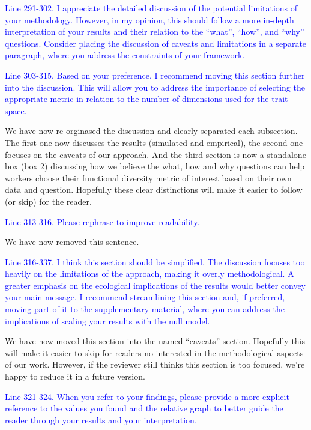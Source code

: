 \documentclass[
]{article}
\begin{document}
\textcolor{blue}{Line 291-302.
I appreciate the detailed discussion of the potential limitations of your methodology.
However, in my opinion, this should follow a more in-depth interpretation of your results and their relation to the ``what'', ``how'', and ``why'' questions.
Consider placing the discussion of caveats and limitations in a separate paragraph, where you address the constraints of your framework.}

\textcolor{blue}{Line 303-315.
Based on your preference, I recommend moving this section further into the discussion.
This will allow you to address the importance of selecting the appropriate metric in relation to the number of dimensions used for the trait space.}

We have now re-orginased the discussion and clearly separated each subsection.
The first one now discusses the results (simulated and empirical), the second one focuses on the caveats of our approach.
And the third section is now a standalone box (box 2) discussing how we believe the what, how and why questions can help workers choose their functional diversity metric of interest based on their own data and question.
Hopefully these clear distinctions will make it easier to follow (or skip) for the reader.

\textcolor{blue}{Line 313-316. Please rephrase to improve readability.}

We have now removed this sentence.

\textcolor{blue}{Line 316-337. I think this section should be simplified.
The discussion focuses too heavily on the limitations of the approach, making it overly methodological.
A greater emphasis on the ecological implications of the results would better convey your main message.
I recommend streamlining this section and, if preferred, moving part of it to the supplementary material, where you can address the implications of scaling your results with the null model.}

We have now moved this section into the named ``caveats'' section.
Hopefully this will make it easier to skip for readers no interested in the methodological aspects of our work.
However, if the reviewer still thinks this section is too focused, we're happy to reduce it in a future version.

\textcolor{blue}{Line 321-324. When you refer to your findings, please provide a more explicit reference to the values you found and the relative graph to better guide the reader through your results and your interpretation.}
\end{document}

